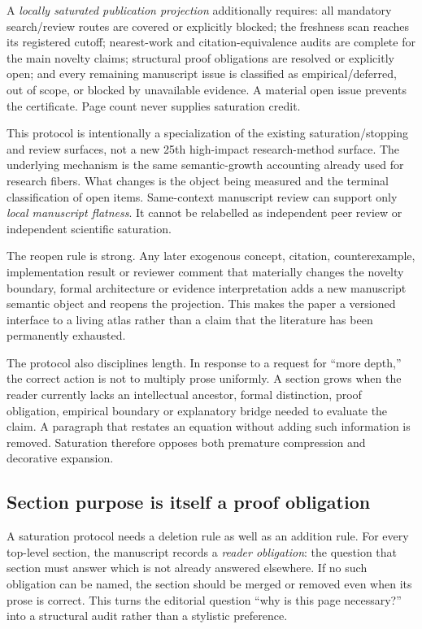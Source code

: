 A \emph{locally saturated publication projection} additionally requires: all mandatory search/review routes are covered or explicitly blocked; the freshness scan reaches its registered cutoff; nearest-work and citation-equivalence audits are complete for the main novelty claims; structural proof obligations are resolved or explicitly open; and every remaining manuscript issue is classified as empirical/deferred, out of scope, or blocked by unavailable evidence. A material open issue prevents the certificate. Page count never supplies saturation credit.

This protocol is intentionally a specialization of the existing saturation/stopping and review surfaces, not a new 25th high-impact research-method surface. The underlying mechanism is the same semantic-growth accounting already used for research fibers. What changes is the object being measured and the terminal classification of open items. Same-context manuscript review can support only \emph{local manuscript flatness}. It cannot be relabelled as independent peer review or independent scientific saturation.

The reopen rule is strong. Any later exogenous concept, citation, counterexample, implementation result or reviewer comment that materially changes the novelty boundary, formal architecture or evidence interpretation adds a new manuscript semantic object and reopens the projection. This makes the paper a versioned interface to a living atlas rather than a claim that the literature has been permanently exhausted.

The protocol also disciplines length. In response to a request for ``more depth,'' the correct action is not to multiply prose uniformly. A section grows when the reader currently lacks an intellectual ancestor, formal distinction, proof obligation, empirical boundary or explanatory bridge needed to evaluate the claim. A paragraph that restates an equation without adding such information is removed. Saturation therefore opposes both premature compression and decorative expansion.

\subsection{Section purpose is itself a proof obligation}

A saturation protocol needs a deletion rule as well as an addition rule. For every top-level section, the manuscript records a \emph{reader obligation}: the question that section must answer which is not already answered elsewhere. If no such obligation can be named, the section should be merged or removed even when its prose is correct. This turns the editorial question ``why is this page necessary?'' into a structural audit rather than a stylistic preference.

